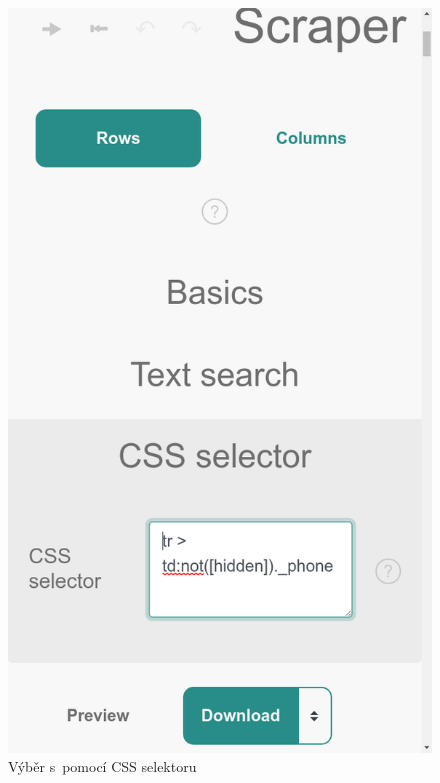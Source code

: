 \documentclass[thesis=B,czech]{FITthesis}[2012/06/26]
\begin{document}
\begin{figure}[h]
\begin{minipage}{.5\linewidth}
		\includegraphics[width=.75\linewidth]{images/Scraper_css_selector.png}
		\caption{Výběr s~pomocí CSS \newline selektoru}
		\label{fig:scraper_css_selector}
	\end{minipage}
\end{figure}
\end{document}
